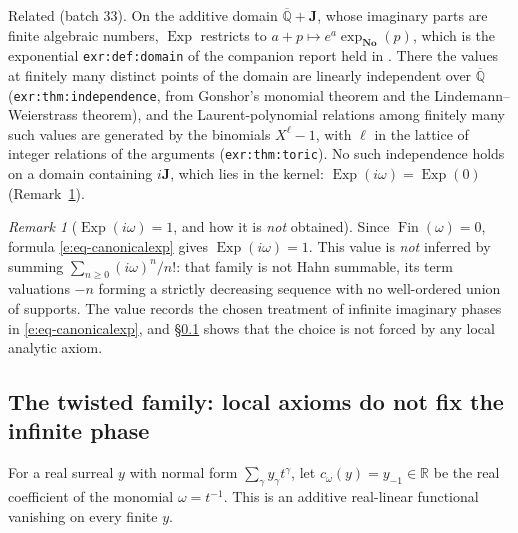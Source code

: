 \documentclass[11pt,a4paper]{article}
\numberwithin{equation}{section}
\theoremstyle{definition}
\theoremstyle{remark}
\newtheorem{remark}[theorem]{Remark}
\theoremstyle{plain}
\newcommand{\No}{\mathbf{No}}
\newcommand{\Jpi}{\mathbf J}
\newcommand{\RR}{\mathbb R}
\DeclareMathOperator{\Exp}{Exp}
\newcommand{\tm}{t}
\begin{document}
Related (batch 33).  On the additive domain $\overline{\mathbb Q}+\Jpi$,
whose imaginary parts are finite algebraic numbers, $\Exp$ restricts to
$a+p\mapsto e^{a}\exp_{\No}(p)$, which is the exponential
\texttt{exr:def:domain} of the companion report held in
.
There the values at finitely many distinct points of the domain are
linearly independent over $\overline{\mathbb Q}$
(\texttt{exr:thm:independence}, from Gonshor's monomial theorem and the
Lindemann--Weierstrass theorem), and the Laurent-polynomial relations among
finitely many such values are generated by the binomials $X^{\ell}-1$, with
$\ell$ in the lattice of integer relations of the arguments
(\texttt{exr:thm:toric}).  No such independence holds on a domain containing
$i\Jpi$, which lies in the kernel: $\Exp(i\omega)=\Exp(0)$
(Remark~\ref{e:rem-iomega}).

\begin{remark}[$\Exp(i\omega)=1$, and how it is \emph{not} obtained]
\label{e:rem-iomega}
Since $\operatorname{Fin}(\omega)=0$, formula
\eqref{e:eq-canonicalexp} gives $\Exp(i\omega)=1$.  This value is
\emph{not} inferred by summing $\sum_{n\ge0}(i\omega)^n/n!$: that family is
not Hahn summable, its term valuations $-n$ forming a strictly decreasing
sequence with no well-ordered union of supports.  The value records the
chosen treatment of infinite imaginary phases in
\eqref{e:eq-canonicalexp}, and \S\ref{e:sec-twisted} shows that the choice
is not forced by any local analytic axiom.
\end{remark}

\subsection{The twisted family: local axioms do not fix the infinite phase}
\label{e:sec-twisted}

For a real surreal $y$ with normal form $\sum_\gamma y_\gamma\tm^{\gamma}$,
let $c_\omega(y)=y_{-1}\in\RR$ be the real coefficient of the monomial
$\omega=\tm^{-1}$.  This is an additive real-linear functional vanishing on
every finite $y$.
\end{document}
